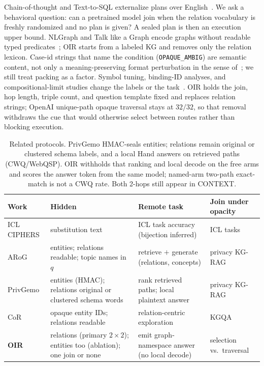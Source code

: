 \documentclass{article}
\begin{document}
Chain-of-thought and Text-to-SQL externalize plans over
English~\citep{wei2022cot,yu2018spider}.
We ask a behavioral question: can a pretrained model join when the relation
vocabulary is freshly randomized and no plan is given? A sealed plan is then
an execution upper bound.
NLGraph and Talk like a Graph encode graphs without readable typed
predicates~\citep{wang2023nlgraph,fatemi2024talk}; OIR starts from a labeled
KG and removes only the relation lexicon.
Case-id strings that name the condition (\texttt{OPAQUE\_AMBIG}) are
semantic content, not only a meaning-preserving format perturbation in the
sense of~\citet{sclar2024spurious}; we still treat packing as a factor.
Symbol tuning, binding-ID analyses, and compositional-limit studies change
the labels or the task~\citep{wei2023symbol,feng2024binding,dziri2023faith}.
OIR holds the join, hop length, triple count, and question template fixed and
replaces relation strings; OpenAI unique-path opaque traversal stays at
$32/32$, so that removal withdraws the cue that would otherwise select
between routes rather than blocking execution.

\begin{table}[t]
\centering
\small
\setlength{\tabcolsep}{3.2pt}
\begin{tabular}{@{}>{\raggedright\arraybackslash}p{1.55cm}
                 >{\raggedright\arraybackslash}p{2.55cm}
                 >{\raggedright\arraybackslash}p{2.85cm}
                 >{\raggedright\arraybackslash}p{2.85cm}@{}}
\toprule
Work & Hidden & Remote task & Join under opacity \\
\midrule
ICL CIPHERS & substitution text & ICL task accuracy (bijection inferred) & ICL tasks \\
ARoG & entities; relations readable; topic names in $q$ & retrieve $+$ generate (relations, concepts) & privacy KG-RAG \\
PrivGemo & entities (HMAC); relations original or clustered schema words & rank retrieved paths; local plaintext answer & privacy KG-RAG \\
CoR & opaque entity IDs; relations readable & relation-centric exploration & KGQA \\
\textbf{OIR} & relations (primary $2{\times}2$); entities too (ablation); one join or none & emit graph-namespace answer (no local decode) & selection vs.\ traversal \\
\bottomrule
\end{tabular}
\caption{Related protocols. PrivGemo HMAC-seals entities; relations remain
original or clustered schema labels, and a local Hand answers on retrieved
paths (CWQ/WebQSP). OIR withholds that ranking and local decode on the free
arms and scores the answer token from the same model; named-arm two-path
exact-match is not a CWQ rate. Both 2-hops still appear in CONTEXT.}
\label{tab:diff}
\end{table}
\FloatBarrier
\end{document}
